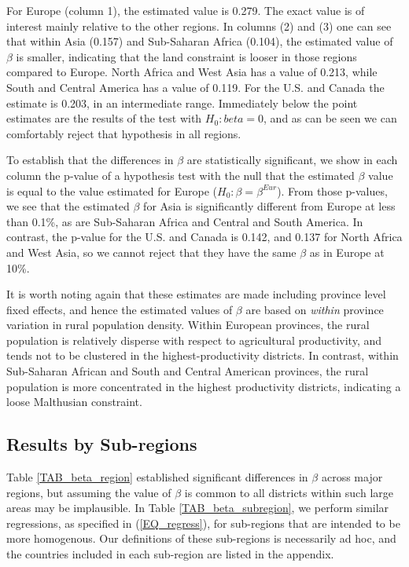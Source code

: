 \documentclass[11pt]{article}
\begin{document}
For Europe (column 1), the estimated value is 0.279. The exact value is of interest mainly relative to the other regions. In columns (2) and (3) one can see that within Asia (0.157) and Sub-Saharan Africa (0.104), the estimated value of $\beta$ is smaller, indicating that the land constraint is looser in those regions compared to Europe. North Africa and West Asia has a value of 0.213, while South and Central America has a value of 0.119. For the U.S. and Canada the estimate is 0.203, in an intermediate range. Immediately below the point estimates are the results of the test with $H_0: beta = 0$, and as can be seen we can comfortably reject that hypothesis in all regions.

To establish that the differences in $\beta$ are statistically significant, we show in each column the p-value of a hypothesis test with the null that the estimated $\beta$ value is equal to the value estimated for Europe ($H_0: \beta = \beta^{Eur}$). From those p-values, we see that the estimated $\beta$ for Asia is significantly different from Europe at less than 0.1\%, as are Sub-Saharan Africa and Central and South America. In contrast, the p-value for the U.S. and Canada is 0.142, and 0.137 for North Africa and West Asia, so we cannot reject that they have the same $\beta$ as in Europe at 10\%.

It is worth noting again that these estimates are made including province level fixed effects, and hence the estimated values of $\beta$ are based on \textit{within} province variation in rural population density. Within European provinces, the rural population is relatively disperse with respect to agricultural productivity, and tends not to be clustered in the highest-productivity districts. In contrast, within Sub-Saharan African and South and Central American provinces, the rural population is more concentrated in the highest productivity districts, indicating a loose Malthusian constraint.

\subsection{Results by Sub-regions}
Table \ref{TAB_beta_region} established significant differences in $\beta$ across major regions, but assuming the value of $\beta$ is common to all districts within such large areas may be implausible. In Table \ref{TAB_beta_subregion}, we perform similar regressions, as specified in (\ref{EQ_regress}), for sub-regions that are intended to be more homogenous. Our definitions of these sub-regions is necessarily ad hoc, and the countries included in each sub-region are listed in the appendix.
\end{document}
